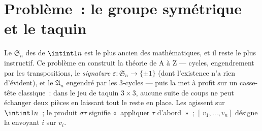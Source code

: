 \section{Problème~: le groupe symétrique et le taquin}

\begin{problem}\label{pb:b1:structures:1}
Le  $\mathfrak S_n$ des  de $\intint1n$ est le plus
ancien  des mathématiques, et il reste le plus instructif. Ce
problème en construit la théorie de A à Z --- cycles, engendrement
par les transpositions, le  \emph{signature}
$\varepsilon \colon \mathfrak S_n \to \{\pm1\}$ (dont l'existence n'a
rien d'évident), et le  $\mathfrak A_n$ engendré par les
$3$-cycles --- puis la met à profit sur un casse-tête classique~:
dans le jeu de taquin $3 \times 3$, aucune suite de coups ne peut
échanger deux pièces en laissant tout le reste en place.
Les  agissent sur $\intint1n$~; le produit $\sigma\tau$
signifie «~appliquer $\tau$ d'abord~»~; $[\,v_1, \dots, v_n]$ désigne
la  envoyant $i$ sur $v_i$.


\end{problem}
